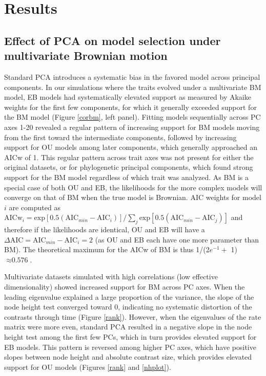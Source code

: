 \documentclass[a4paper,11pt]{article}
\begin{document}
\section{Results}
\subsection{Effect of PCA on model selection under multivariate Brownian motion}
Standard PCA introduces a systematic bias in the favored model across principal components. In our simulations where the traits evolved under a multivariate BM model, EB models had systematically elevated support as measured by Akaike weights for the first few components, for which it generally exceeded support for the BM model (Figure \ref{corbm}, left panel). Fitting models sequentially across PC axes 1-20 revealed a regular pattern of increasing support for BM models moving from the first toward the intermediate components, followed by increasing support for OU models among later components, which generally approached an AICw of 1. This regular pattern across trait axes was not present for either the original datasets, or for phylogenetic principal components, which found strong support for the BM model regardless of which trait was analyzed. As BM is a special case of both OU and EB, the likelihoods for the more complex models will converge on that of BM when the true model is Brownian. AIC weights for model $i$ are computed as
$\text{AICw}_i = \text{exp}[\text{0.5}(\text{AIC}_{min} - \text{AIC}_i)]/\sum_j \text{exp}[\text{0.5}(\text{AIC}_{min} - \text{AIC}_j)]$
and therefore if the likelihoods are identical, OU and EB will have a $\Delta \text{AIC} = \text{AIC}_{min} - \text{AIC}_i = \text{2}$ (as OU and EB each have one more parameter than BM). The theoretical maximum for the AICw of BM is thus 1/(2$e^{-\text{1}} +$ 1) $\approx \text{0.576}$.
 
Multivariate datasets simulated with high correlations (low effective dimensionality) showed increased support for BM across PC axes. When the leading eigenvalue explained a large proportion of the variance, the slope of the node height test converged toward 0, indicating no systematic distortion of the contrasts through time (Figure \ref{rank}). However, when the eigenvalues of the rate matrix were more even, standard PCA resulted in a negative slope in the node height test among the first few PCs, which in turn provides elevated support for EB models. This pattern is reversed among higher PC axes, which have positive slopes between node height and absolute contrast size, which provides elevated support for OU models (Figures \ref{rank} and \ref{nhplot}). 
\end{document}

